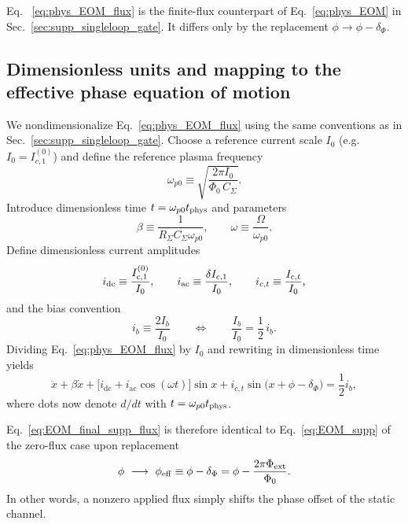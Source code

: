 \documentclass[prl,twocolumn,superscriptaddress,showpacs,nofootinbib]{revtex4-2}
\begin{document}
Eq. ~\eqref{eq:phys_EOM_flux} is the finite-flux counterpart of
Eq.~\eqref{eq:phys_EOM} in Sec.~\ref{sec:supp_singleloop_gate}. It differs only by the replacement $\phi\to\phi-\delta_\Phi$.

\subsection{Dimensionless units and mapping to the effective phase equation of motion}

We nondimensionalize Eq.~\eqref{eq:phys_EOM_flux} using the same conventions as
in Sec.~\ref{sec:supp_singleloop_gate}.
Choose a reference current scale $I_0$ (e.g. $I_0=I_{c,1}^{(0)}$) and define the
reference plasma frequency
\begin{equation}
\omega_{p0}\equiv
\sqrt{\frac{2\pi I_0}{\Phi_0\,C_\Sigma}}.
\label{eq:wp0_def_flux}
\end{equation}
Introduce dimensionless time $t=\omega_{p0}t_{\rm phys}$ and parameters
\begin{equation}
\beta \equiv \frac{1}{R_\Sigma C_\Sigma \omega_{p0}},
\qquad
\omega\equiv \frac{\Omega}{\omega_{p0}}.
\label{eq:beta_omega_def_flux}
\end{equation}
Define dimensionless current amplitudes
\begin{equation}
i_{\rm dc}\equiv \frac{I_{c,1}^{(0)}}{I_0},
\qquad
i_{\rm ac}\equiv \frac{\delta I_{c,1}}{I_0},
\qquad
i_{c,t}\equiv \frac{I_{c,t}}{I_0},
\label{eq:dimensionless_Ic_flux}
\end{equation}
and the bias convention
\begin{equation}
i_b \equiv \frac{2 I_b}{I_0}
\qquad \Longleftrightarrow \qquad
\frac{I_b}{I_0}=\frac12\,i_b.
\label{eq:ib_convention_flux}
\end{equation}
Dividing Eq.~\eqref{eq:phys_EOM_flux} by $I_0$ and rewriting in dimensionless
time yields
\begin{equation}
\ddot x + \beta \dot x
+ \big[i_{\mathrm{dc}}+i_{\mathrm{ac}}\cos(\omega t)\big]\sin x
+ i_{c,t} \sin\!\big(x+\phi-\delta_\Phi\big)
= \frac{1}{2} i_b ,
\label{eq:EOM_final_supp_flux}
\end{equation}
where dots now denote $d/dt$ with $t=\omega_{p0}t_{\rm phys}$.

Eq.~\eqref{eq:EOM_final_supp_flux} is therefore identical to
Eq.~\eqref{eq:EOM_supp} of the zero-flux case upon replacement
\begin{equation}
\phi \ \longrightarrow\ \phi_{\rm eff}\equiv \phi-\delta_\Phi
= \phi - \frac{2\pi \Phi_{\rm ext}}{\Phi_0}.
\label{eq:phi_to_phi_eff}
\end{equation}
In other words, a nonzero applied flux simply shifts the phase offset of the static channel.
\end{document}
